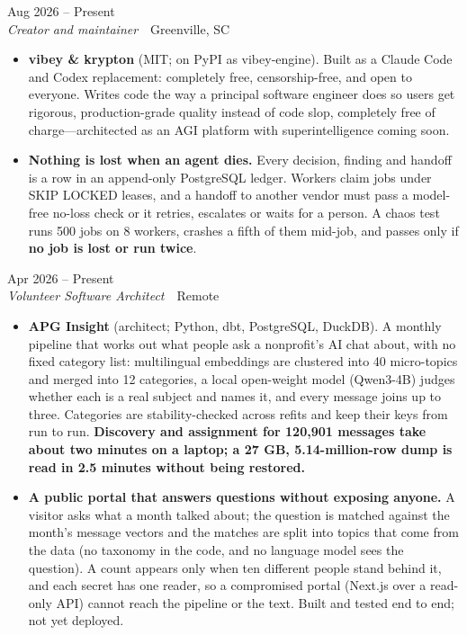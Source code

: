 \documentclass[10pt,letterpaper]{article}
\newcommand{\szmeta}{\fontsize{8pt}{10pt}\selectfont}
\begin{document}
\vspace{3pt}
 \hfill {\color{muted}\szmeta Aug 2026 – Present}\\[1pt]
{\itshape Creator and maintainer}{\color{muted}\ \textbullet\ Greenville, SC}
\vspace{2pt}
\begin{itemize}
\item \textbf{vibey \& krypton} {\color{muted}(MIT; on PyPI as vibey-engine)}. Built as a Claude Code and Codex replacement: completely free, censorship-free, and open to everyone. Writes code the way a principal software engineer does so users get rigorous, production-grade quality instead of code slop, completely free of charge—architected as an AGI platform with superintelligence coming soon.
\item \textbf{Nothing is lost when an agent dies.} Every decision, finding and handoff is a row in an append-only PostgreSQL ledger. Workers claim jobs under SKIP LOCKED leases, and a handoff to another vendor must pass a model-free no-loss check or it retries, escalates or waits for a person. A chaos test runs 500 jobs on 8 workers, crashes a fifth of them mid-job, and passes only if \textbf{no job is lost or run twice}.
\end{itemize}
\vspace{3pt}
 \hfill {\color{muted}\szmeta Apr 2026 – Present}\\[1pt]
{\itshape Volunteer Software Architect}{\color{muted}\ \textbullet\ Remote}
\vspace{2pt}
\begin{itemize}
\item \textbf{APG Insight} {\color{muted}(architect; Python, dbt, PostgreSQL, DuckDB)}. A monthly pipeline that works out what people ask a nonprofit's AI chat about, with no fixed category list: multilingual embeddings are clustered into 40 micro-topics and merged into 12 categories, a local open-weight model (Qwen3-4B) judges whether each is a real subject and names it, and every message joins up to three. Categories are stability-checked across refits and keep their keys from run to run. \textbf{Discovery and assignment for 120,901 messages take about two minutes on a laptop; a 27 GB, 5.14-million-row dump is read in 2.5 minutes without being restored.}
\item \textbf{A public portal that answers questions without exposing anyone.} A visitor asks what a month talked about; the question is matched against the month's message vectors and the matches are split into topics that come from the data (no taxonomy in the code, and no language model sees the question). A count appears only when ten different people stand behind it, and each secret has one reader, so a compromised portal (Next.js over a read-only API) cannot reach the pipeline or the text. Built and tested end to end; not yet deployed.
\end{itemize}
\end{document}
